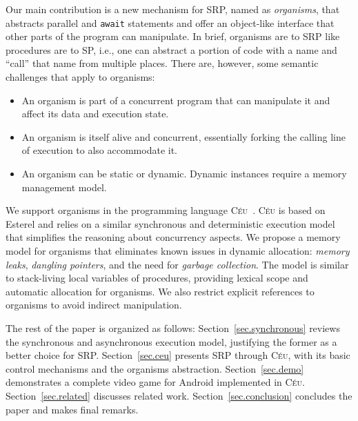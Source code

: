 \documentclass{acm_proc_article-sp}
\newcommand{\CEU}{\textsc{C\'{e}u}\xspace}
\newcommand{\code}[1] {{\small{\texttt{#1}}}}
\newcommand{\1}{\;}
\newcommand{\2}{\;\;}
\newcommand{\3}{\;\;\;}
\newcommand{\5}{\;\;\;\;\;}
\begin{document}
Our main contribution is a new mechanism for SRP, named as \emph{organisms}, 
that abstracts parallel and \code{await} statements and offer an object-like 
interface that other parts of the program can manipulate.
%
In brief, organisms are to SRP like procedures are to SP, i.e., one can 
abstract a portion of code with a name and ``call'' that name from multiple 
places.
%
There are, however, some semantic challenges that apply to organisms:
%
\begin{itemize}
\item An organism is part of a concurrent program that can manipulate it and 
affect its data and execution state.
\item An organism is itself alive and concurrent, essentially forking the 
calling line of execution to also accommodate it.
\item An organism can be static or dynamic. Dynamic instances require a memory 
management model.
\end{itemize}

We support organisms in the programming language \CEU~\cite{ceu.sensys13}.
%
\CEU is based on Esterel and relies on a similar synchronous and deterministic 
execution model that simplifies the reasoning about concurrency aspects.
%
We propose a memory model for organisms that eliminates known issues in dynamic 
allocation: \emph{memory leaks}, \emph{dangling pointers}, and the need for 
\emph{garbage collection}.
%
The model is similar to stack-living local variables of procedures, providing 
lexical scope and automatic allocation for organisms.
We also restrict explicit references to organisms to avoid indirect 
manipulation.

The rest of the paper is organized as follows:
Section~\ref{sec.synchronous} reviews the synchronous and asynchronous 
execution model, justifying the former as a better choice for SRP.
Section~\ref{sec.ceu} presents SRP through \CEU, with its basic control 
mechanisms and the organisms abstraction.
Section~\ref{sec.demo} demonstrates a complete video game for Android 
implemented in \CEU.
Section~\ref{sec.related} discusses related work.
Section~\ref{sec.conclusion} concludes the paper and makes final remarks.
\end{document}

